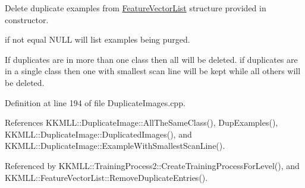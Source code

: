 Delete duplicate examples from \hyperlink{class_k_k_m_l_l_1_1_feature_vector_list}{Feature\+Vector\+List} structure provided in constructor. 

if not equal N\+U\+LL will list examples being purged.

If duplicates are in more than one class then all will be deleted. if duplicates are in a single class then one with smallest scan line will be kept while all others will be deleted. 

Definition at line 194 of file Duplicate\+Images.\+cpp.



References K\+K\+M\+L\+L\+::\+Duplicate\+Image\+::\+All\+The\+Same\+Class(), Dup\+Examples(), K\+K\+M\+L\+L\+::\+Duplicate\+Image\+::\+Duplicated\+Images(), and K\+K\+M\+L\+L\+::\+Duplicate\+Image\+::\+Example\+With\+Smallest\+Scan\+Line().



Referenced by K\+K\+M\+L\+L\+::\+Training\+Process2\+::\+Create\+Training\+Process\+For\+Level(), and K\+K\+M\+L\+L\+::\+Feature\+Vector\+List\+::\+Remove\+Duplicate\+Entries().


